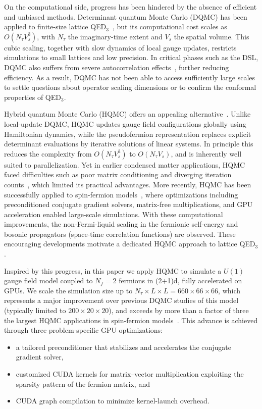 \documentclass[aps,prl,twocolumn,superscriptaddress,showpacs,longbibliography]{revtex4-2}
\begin{document}
On the computational side, progress has been hindered by the absence of efficient and unbiased methods. Determinant quantum Monte Carlo (DQMC) has been applied to finite-size lattice QED$_3$~\cite{XYXuU12018,wangDynamics2019, janssenConfinement2020}, but its computational cost scales as $O(N_\tau V_s^3)$, with $N_\tau$ the imaginary-time extent and $V_s$ the spatial volume. This cubic scaling, together with slow dynamics of local gauge updates, restricts simulations to small lattices and low precision. In critical phases such as the DSL, DQMC also suffers from severe autocorrelation effects~\cite{panSelf2025}, further reducing efficiency. As a result, DQMC has not been able to access sufficiently large scales to settle questions about operator scaling dimensions or to confirm the conformal properties of QED$_3$.

Hybrid quantum Monte Carlo (HQMC) offers an appealing alternative~\cite{Scalettar1987,Duane1987,Gupta1988,Beyl2018}. Unlike local-update DQMC, HQMC updates gauge field configurations globally using Hamiltonian dynamics, while the pseudofermion representation replaces explicit determinant evaluations by iterative solutions of linear systems. In principle this reduces the complexity from $O(N_\tau V_s^3)$ to $O(N_\tau V_s)$, and is inherently well suited to parallelization. Yet in earlier condensed matter applications, HQMC faced difficulties such as poor matrix conditioning and diverging iteration counts~\cite{Scalettar1987,White1988}, which limited its practical advantages. More recently, HQMC has been successfully applied to spin-fermion models~\cite{patel2024strange,lunts2023non}, where optimizations including preconditioned conjugate gradient solvers, matrix-free multiplications, and GPU acceleration enabled large-scale simulations.   With these computational improvements, the non-Fermi-liquid scaling in the fermionic self-energy and bosonic propagators (space-time correlation functions) are observed. These encouraging developments motivate a dedicated HQMC approach to lattice QED$_3$.

Inspired by this progress, in this paper we apply HQMC to simulate a $U(1)$ gauge field model coupled to $N_f=2$ fermions in (2+1)d, fully accelerated on GPUs. We scale the simulation size up to $N_\tau \times L \times L = 660 \times 66 \times 66$, which represents a major improvement over previous DQMC studies of this model~\cite{XYXuU12018,wangDynamics2019,janssenConfinement2020} (typically limited to $200 \times 20 \times 20$), and exceeds by more than a factor of three the largest HQMC applications in spin-fermion models~\cite{patel2024strange,lunts2023non}. This advance is achieved through three problem-specific GPU optimizations:
\begin{itemize}
\item a tailored preconditioner that stabilizes and accelerates the conjugate gradient solver,
\item customized CUDA kernels for matrix–vector multiplication exploiting the sparsity pattern of the fermion matrix, and
\item CUDA graph compilation to minimize kernel-launch overhead.
\end{itemize}
\end{document}
